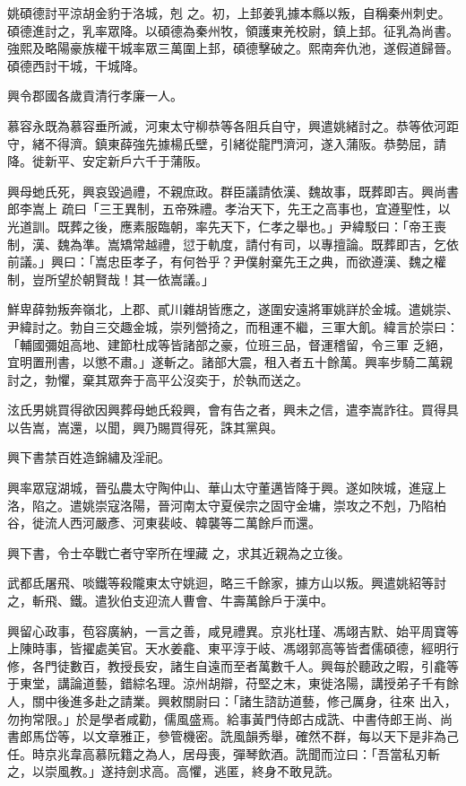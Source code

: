\begin{pinyinscope}
 姚碩德討平涼胡金豹于洛城，剋
 之。初，上邽姜乳據本縣以叛，自稱秦州刺史。碩德進討之，乳率眾降。以碩德為秦州牧，領護東羌校尉，鎮上邽。征乳為尚書。強熙及略陽豪族權干城率眾三萬圍上邽，碩德擊破之。熙南奔仇池，遂假道歸晉。碩德西討干城，干城降。



 興令郡國各歲貢清行孝廉一人。



 慕容永既為慕容垂所滅，河東太守柳恭等各阻兵自守，興遣姚緒討之。恭等依河距守，緒不得濟。鎮東薛強先據楊氏壁，引緒從龍門濟河，遂入蒲阪。恭勢屈，請降。徙新平、安定新戶六千于蒲阪。



 興母虵氏死，興哀毀過禮，不親庶政。群臣議請依漢、魏故事，既葬即吉。興尚書郎李嵩上
 疏曰「三王異制，五帝殊禮。孝治天下，先王之高事也，宜遵聖性，以光道訓。既葬之後，應素服臨朝，率先天下，仁孝之舉也。」尹緯駁曰：「帝王喪制，漢、魏為準。嵩矯常越禮，愆于軌度，請付有司，以專擅論。既葬即吉，乞依前議。」興曰：「嵩忠臣孝子，有何咎乎？尹僕射棄先王之典，而欲遵漢、魏之權制，豈所望於朝賢哉！其一依嵩議。」



 鮮卑薛勃叛奔嶺北，上郡、貳川雜胡皆應之，遂圍安遠將軍姚詳於金城。遣姚崇、尹緯討之。勃自三交趣金城，崇列營掎之，而租運不繼，三軍大飢。緯言於崇曰：「輔國彌姐高地、建節杜成等皆諸部之豪，位班三品，督運稽留，令三軍
 乏絕，宜明置刑書，以懲不肅。」遂斬之。諸部大震，租入者五十餘萬。興率步騎二萬親討之，勃懼，棄其眾奔于高平公沒奕于，於執而送之。



 泫氏男姚買得欲因興葬母虵氏殺興，會有告之者，興未之信，遣李嵩詐往。買得具以告嵩，嵩還，以聞，興乃賜買得死，誅其黨與。



 興下書禁百姓造錦繡及淫祀。



 興率眾寇湖城，晉弘農太守陶仲山、華山太守董邁皆降于興。遂如陜城，進寇上洛，陷之。遣姚崇寇洛陽，晉河南太守夏侯宗之固守金墉，崇攻之不剋，乃陷柏谷，徙流人西河嚴彥、河東裴岐、韓襲等二萬餘戶而還。



 興下書，令士卒戰亡者守宰所在埋藏
 之，求其近親為之立後。



 武都氐屠飛、啖鐵等殺隴東太守姚迴，略三千餘家，據方山以叛。興遣姚紹等討之，斬飛、鐵。遣狄伯支迎流人曹會、牛壽萬餘戶于漢中。



 興留心政事，苞容廣納，一言之善，咸見禮異。京兆杜瑾、馮翊吉默、始平周寶等上陳時事，皆擢處美官。天水姜龕、東平淳于岐、馮翊郭高等皆耆儒碩德，經明行修，各門徒數百，教授長安，諸生自遠而至者萬數千人。興每於聽政之暇，引龕等于東堂，講論道藝，錯綜名理。涼州胡辯，苻堅之末，東徙洛陽，講授弟子千有餘人，關中後進多赴之請業。興敕關尉曰：「諸生諮訪道藝，修己厲身，往來
 出入，勿拘常限。」於是學者咸勸，儒風盛焉。給事黃門侍郎古成詵、中書侍郎王尚、尚書郎馬岱等，以文章雅正，參管機密。詵風韻秀舉，確然不群，每以天下是非為己任。時京兆韋高慕阮籍之為人，居母喪，彈琴飲酒。詵聞而泣曰：「吾當私刃斬之，以崇風教。」遂持劍求高。高懼，逃匿，終身不敢見詵。




\end{pinyinscope}
